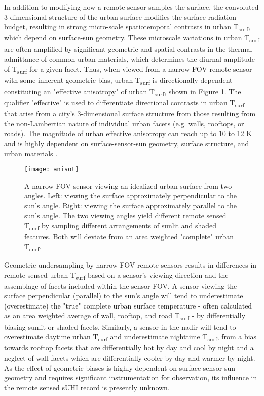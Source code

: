 \begin{bibunit}
In addition to modifying how a remote sensor samples the surface, the convoluted 3-dimensional structure of the urban surface modifies the surface radiation budget, resulting in strong micro-scale spatiotemporal contrasts in urban T\textsubscript{surf}, which depend on surface-sun geometry. These microscale variations in urban T\textsubscript{surf} are often amplified by significant geometric and spatial contrasts in the thermal admittance of common urban materials, which determines the diurnal amplitude of T\textsubscript{surf} for a given facet. Thus, when viewed from a narrow-FOV remote sensor with some inherent geometric bias, urban T\textsubscript{surf} is directionally dependent - constituting an "effective anisotropy" of urban T\textsubscript{surf}, shown in Figure \ref{anisot}. The qualifier "effective" is used to differentiate directional contrasts in urban T\textsubscript{surf} that arise from a city's 3-dimensional surface structure from those resulting from the non-Lambertian nature of individual urban facets (e.g. walls, rooftops, or roads). The magnitude of urban effective anisotropy can reach up to 10 to 12 \si{\kelvin} and is highly dependent on surface-sensor-sun geometry, surface structure, and urban materials \citep{Krayenhoff2016, Voogt1997,Lagouarde2012}. 

\begin{figure}[H]
	\centering
	\texttt{[image: anisot]}
	\caption{A narrow-FOV sensor viewing an idealized urban surface from two angles. Left: viewing the surface approximately perpendicular to the sun's angle. Right: viewing the surface approximately parallel to the sun's angle. The two viewing angles yield different remote sensed T\textsubscript{surf} by sampling different arrangements of sunlit and shaded features. Both will deviate from an area weighted "complete" urban T\textsubscript{surf}.}
	\label{anisot}
\end{figure}

Geometric undersampling by narrow-FOV remote sensors results in differences in remote sensed urban T\textsubscript{surf} based on a sensor's viewing direction and the assemblage of facets included within the sensor FOV. A sensor viewing the surface perpendicular (parallel) to the sun's angle will tend to underestimate (overestimate) the "true" complete urban surface temperature - often calculated as an area weighted average of wall, rooftop, and road T\textsubscript{surf} - by differentially biasing sunlit or shaded facets. Similarly, a sensor in the nadir will tend to overestimate daytime urban T\textsubscript{surf} and underestimate nighttime T\textsubscript{surf}, from a bias towards rooftop facets that are differentially hot by day and cool by night and a neglect of wall facets which are differentially cooler by day and warmer by night. As the effect of geometric biases is highly dependent on surface-sensor-sun geometry and requires significant instrumentation for observation, its influence in the remote sensed sUHI record is presently unknown.


\end{bibunit}
